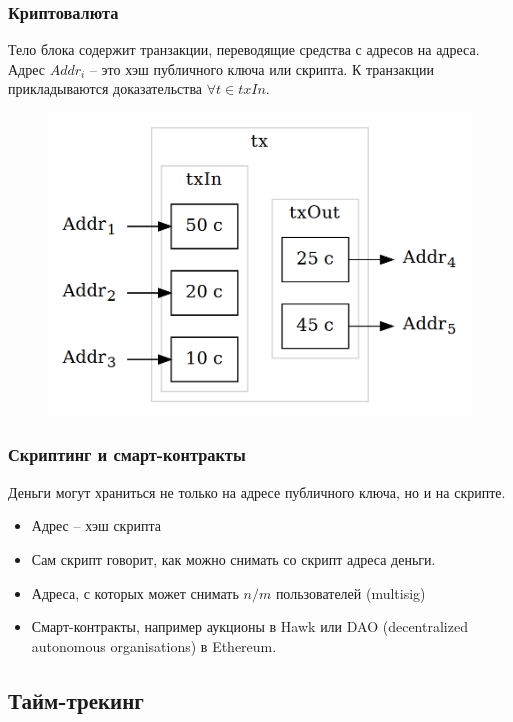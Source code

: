 \documentclass[11pt,handout,pdf,hyperref={unicode}]{beamer}
\begin{document}
\begin{frame}
  \frametitle{Криптовалюта}

  Тело блока содержит транзакции, переводящие средства с адресов на
  адреса. Адрес $Addr_i$ -- это хэш публичного ключа или скрипта. К
  транзакции прикладываются доказательства $\forall t \in txIn$.

  \begin{figure}[t]
  \includegraphics[scale=0.2]{tx_example}
  \centering
  \end{figure}
\end{frame}

\begin{frame}
  \frametitle{Скриптинг и смарт-контракты}

  Деньги могут храниться не только на адресе публичного ключа, но и на скрипте.
  \begin{itemize}
  \item Адрес -- хэш скрипта
  \item Сам скрипт говорит, как можно снимать со скрипт адреса деньги.
  \item Адреса, с которых может снимать $n/m$ пользователей (multisig)
  \item Смарт-контракты, например аукционы в Hawk \parencite{kosba2016hawk}
    или DAO (decentralized autonomous organisations) в Ethereum.
  \end{itemize}
\end{frame}

\subsection{Тайм-трекинг}
\end{document}
